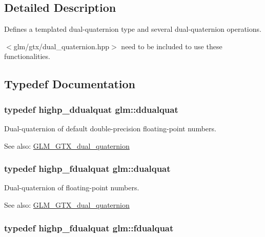 \subsection{Detailed Description}
Defines a templated dual-quaternion type and several dual-quaternion operations. 

$<$glm/gtx/dual\_\-quaternion.hpp$>$ need to be included to use these functionalities. 

\subsection{Typedef Documentation}
\hypertarget{group__gtc__dual__quaternion_g373431ffdd82d5c03c258217a9e1f1a6}{
\subsubsection[ddualquat]{\setlength{\rightskip}{0pt plus 5cm}typedef highp\_\-ddualquat {\bf glm::ddualquat}}}
\label{group__gtc__dual__quaternion_g373431ffdd82d5c03c258217a9e1f1a6}


Dual-quaternion of default double-precision floating-point numbers.

\begin{Desc}
\item[See also:]\hyperlink{group__gtc__dual__quaternion}{GLM\_\-GTX\_\-dual\_\-quaternion} \end{Desc}
\hypertarget{group__gtc__dual__quaternion_g2f6227b5f9dc08a2e7682065a84b3aa9}{
\subsubsection[dualquat]{\setlength{\rightskip}{0pt plus 5cm}typedef highp\_\-fdualquat {\bf glm::dualquat}}}
\label{group__gtc__dual__quaternion_g2f6227b5f9dc08a2e7682065a84b3aa9}


Dual-quaternion of floating-point numbers.

\begin{Desc}
\item[See also:]\hyperlink{group__gtc__dual__quaternion}{GLM\_\-GTX\_\-dual\_\-quaternion} \end{Desc}
\hypertarget{group__gtc__dual__quaternion_g436906129bc69ca5059555cafcbac9fd}{
\subsubsection[fdualquat]{\setlength{\rightskip}{0pt plus 5cm}typedef highp\_\-fdualquat {\bf glm::fdualquat}}}
\label{group__gtc__dual__quaternion_g436906129bc69ca5059555cafcbac9fd}


